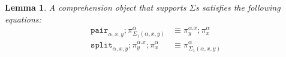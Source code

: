 \documentclass[10pt]{article}
\newtheorem{lemma}{Lemma}
\theoremstyle{definition}
\newcommand{\id}{\mathsf{id}}
\newcommand\bdot[0]{\mathbin{.}}
\newcommand\ApPlus[2]{\ensuremath{{#1}^+ \langle #2 \rangle }}
\newcommand{\tdot}{\ensuremath{\mathtt{dot}}}
\newcommand\One{\ensuremath{\mathds{1}}}
\newcommand\ApOne[1]{\ensuremath{\One_{\langle {#1} \rangle }}}
\newcommand\contract[1]{\ensuremath{\mathtt{contract}_{#1}}}
\newcommand\fibpair[1]{\ensuremath{\mathtt{fibpair}_{#1}}}
\newcommand\pair[1]{\ensuremath{\mathtt{pair}_{#1}}}
\newcommand\tsplit[1]{\ensuremath{\mathtt{split}_{#1}}}
\begin{document}
\begin{lemma}
A comprehension object that supports $\Sigma$s satisfies the following equations:
\begin{align}
\pair{\alpha,x,y};\pi^\alpha_{\Sigma_1(\alpha, x, y)} &\equiv \pi^{\alpha.x}_y;\pi^\alpha_x \\
\tsplit{\alpha,x,y};\pi^{\alpha.x}_y;\pi^\alpha_x &\equiv \pi^\alpha_{\Sigma_1(\alpha, x, y)} %
\end{align}
\end{lemma}
\end{document}
